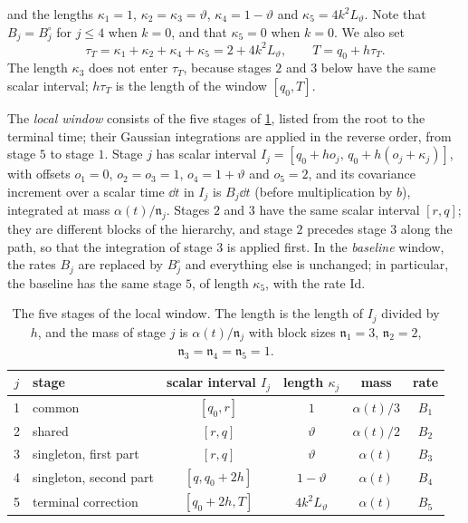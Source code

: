 and the lengths $\kappa_1=1$, $\kappa_2=\kappa_3=\vartheta$,
$\kappa_4=1-\vartheta$ and $\kappa_5=4k^2L_\vartheta$. Note that
$B_j=B_j^\circ$ for $j\le4$ when $k=0$, and that $\kappa_5=0$ when $k=0$. We
also set
\begin{equation}\label{eq:cub-T}
 \tau_T=\kappa_1+\kappa_2+\kappa_4+\kappa_5=2+4k^2L_\vartheta,\qquad T=q_0+h\tau_T.
\end{equation}
The length $\kappa_3$ does not enter $\tau_T$, because stages $2$ and $3$ below
have the same scalar interval; $h\tau_T$ is the length of the window $[q_0,T]$.

The \emph{local window} consists of the five stages of \cref{tab:cub-stages},
listed from the root to the terminal time; their Gaussian integrations are
applied in the reverse order, from stage $5$ to stage $1$. Stage $j$ has scalar interval
$I_j=[q_0+ho_j,\,q_0+h(o_j+\kappa_j)]$, with offsets $o_1=0$,
$o_2=o_3=1$, $o_4=1+\vartheta$ and $o_5=2$, and its covariance increment over
a scalar time $\dd t$ in $I_j$ is $B_j\dd t$ (before multiplication by $b$),
integrated at mass $\alpha(t)/\mathfrak n_j$. Stages $2$ and $3$ have the same scalar
interval $[r,q]$; they are different blocks of the hierarchy, and stage $2$
precedes stage $3$ along the path, so that the integration of stage $3$ is
applied first. In the \emph{baseline} window, the rates
$B_j$ are replaced by $B_j^\circ$ and everything else is unchanged; in
particular, the baseline has the same stage $5$, of length $\kappa_5$, with
the rate $\mathrm{Id}$.

\begin{table}[ht]
\centering
\begin{tabular}{@{}clcccc@{}}
\toprule
$j$ & stage & scalar interval $I_j$ & length $\kappa_j$ & mass & rate\\
\midrule
1 & common & $[q_0,r]$ & $1$ & $\alpha(t)/3$ & $B_1$\\
2 & shared & $[r,q]$ & $\vartheta$ & $\alpha(t)/2$ & $B_2$\\
3 & singleton, first part & $[r,q]$ & $\vartheta$ & $\alpha(t)$ & $B_3$\\
4 & singleton, second part & $[q,q_0+2h]$ & $1-\vartheta$ & $\alpha(t)$ & $B_4$\\
5 & terminal correction & $[q_0+2h,T]$ & $4k^2L_\vartheta$ & $\alpha(t)$ & $B_5$\\
\bottomrule
\end{tabular}
\caption{The five stages of the local window. The length is the length of
$I_j$ divided by $h$, and the mass of stage $j$ is $\alpha(t)/\mathfrak n_j$ with block
sizes $\mathfrak n_1=3$, $\mathfrak n_2=2$, $\mathfrak n_3=\mathfrak n_4=\mathfrak n_5=1$.}\label{tab:cub-stages}
\end{table}

